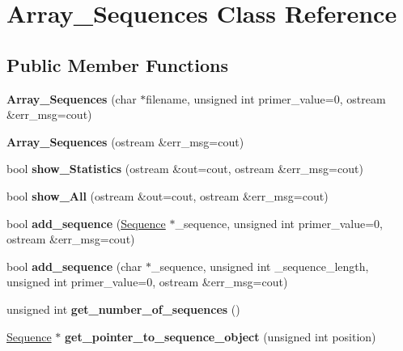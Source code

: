 \hypertarget{class_array___sequences}{}\section{Array\+\_\+\+Sequences Class Reference}
\label{class_array___sequences}
\subsection*{Public Member Functions}
\begin{DoxyCompactItemize}
\item 
\mbox{\label{class_array___sequences_a4960de248d6dceefcae88e66a5a51e8b}} 
{\bfseries Array\+\_\+\+Sequences} (char $\ast$filename, unsigned int primer\+\_\+value=0, ostream \&err\+\_\+msg=cout)
\item 
\mbox{\label{class_array___sequences_ac33a3e2bdca116464baa042a2aea2518}} 
{\bfseries Array\+\_\+\+Sequences} (ostream \&err\+\_\+msg=cout)
\item 
\mbox{\label{class_array___sequences_ab0735daa57cd712e08843e9c79e40488}} 
bool {\bfseries show\+\_\+\+Statistics} (ostream \&out=cout, ostream \&err\+\_\+msg=cout)
\item 
\mbox{\label{class_array___sequences_ad197ef5c061d0cfc564afe5504fa4961}} 
bool {\bfseries show\+\_\+\+All} (ostream \&out=cout, ostream \&err\+\_\+msg=cout)
\item 
\mbox{\label{class_array___sequences_ae4e47e71792255275b01afd35456a9a0}} 
bool {\bfseries add\+\_\+sequence} (\mbox{\hyperlink{class_sequence}{Sequence}} $\ast$\+\_\+sequence, unsigned int primer\+\_\+value=0, ostream \&err\+\_\+msg=cout)
\item 
\mbox{\label{class_array___sequences_aa5e6c65a85deac945f5d11442c4eb319}} 
bool {\bfseries add\+\_\+sequence} (char $\ast$\+\_\+sequence, unsigned int \+\_\+sequence\+\_\+length, unsigned int primer\+\_\+value=0, ostream \&err\+\_\+msg=cout)
\item 
\mbox{\label{class_array___sequences_a76fd0aa59aaf720c64088ab9c900668f}} 
unsigned int {\bfseries get\+\_\+number\+\_\+of\+\_\+sequences} ()
\item 
\mbox{\label{class_array___sequences_a029592cf35f56df0714e5326a3901b74}} 
\mbox{\hyperlink{class_sequence}{Sequence}} $\ast$ {\bfseries get\+\_\+pointer\+\_\+to\+\_\+sequence\+\_\+object} (unsigned int position)
\end{DoxyCompactItemize}
